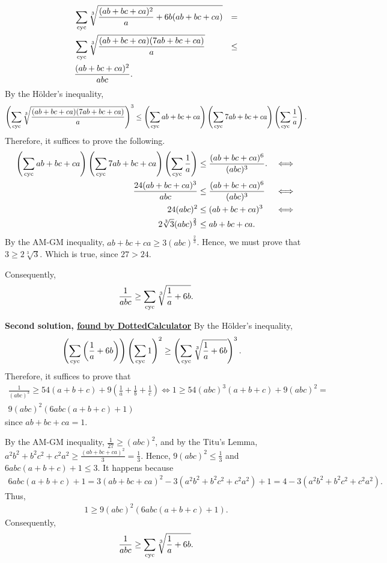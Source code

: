 \begin{align*}
	 & \sum_{\text{cyc}} \sqrt[3]{\frac{(ab+bc+ca)^2}{a}+6b(ab+bc+ca)} & =   \\
	 & \sum_{\text{cyc}} \sqrt[3]{\frac{(ab+bc+ca)(7ab+bc+ca)}{a}}     & \le \\
	 & \frac{(ab+bc+ca)^2}{abc}.
\end{align*}
By the Hölder's inequality,
\begin{align*}
	\left(\sum_{\text{cyc}} \sqrt[3]{\frac{(ab+bc+ca)(7ab+bc+ca)}{a}}\right)^3 \le \left(\sum_{\text{cyc}} ab+bc+ca\right)\left(\sum_{\text{cyc}} 7ab+bc+ca\right)\left(\sum_{\text{cyc}} \frac{1}{a}\right).
\end{align*}
Therefore, it suffices to prove the following.
\begin{align*}
	\left(\sum_{\text{cyc}} ab+bc+ca\right)\left(\sum_{\text{cyc}} 7ab+bc+ca\right)\left(\sum_{\text{cyc}} \frac{1}{a}\right) & \le \frac{(ab+bc+ca)^6}{(abc)^3}. & \iff \\
	\frac{24(ab+bc+ca)^3}{abc}                                                         & \le \frac{(ab+bc+ca)^6}{(abc)^3}  & \iff \\
	24(abc)^2                                                                          & \le (ab+bc+ca)^3                  & \iff \\
	2\sqrt[3]{3}(abc)^{\frac{2}{3}}                                                    & \le ab+bc+ca.
\end{align*}
By the AM-GM inequality, $ab+bc+ca \ge 3(abc)^{\frac{2}{3}}$. Hence, we must prove that $3 \ge 2\sqrt[3]{3}$.
Which is true, since $27>24$.

Consequently,
\[
	\frac{1}{abc} \ge \sum_{\text{cyc}} \sqrt[3]{\frac{1}{a} +6b}.
\]

\textbf{\textcolor{color2}{Second solution, \href{https://artofproblemsolving.com/community/c6h30865p23434282}{found by DottedCalculator}}} By the Hölder's inequality,
\begin{align*}
	\left(\sum_{\text{cyc}} \left(\frac{1}{a}+6b\right)\right)\left(\sum_{\text{cyc}} 1\right)^2 & \ge \left(\sum_{\text{cyc}} \sqrt[3]{\frac{1}{a}+6b}\right)^3.
\end{align*}
Therefore, it suffices to prove that
\begin{align*}
	\frac{1}{(abc)^3} \ge 54(a+b+c)+9\left(\frac{1}{a}+\frac{1}{b}+\frac{1}{c}\right) \iff
	1 \ge 54(abc)^3(a+b+c) + 9(abc)^2 = \\
	9(abc)^2(6abc(a+b+c)+1)
\end{align*}
since $ab+bc+ca=1$.

By the AM-GM inequality, $\frac{1}{27} \ge (abc)^2$, and by the Titu's Lemma, $a^2b^2+b^2c^2+c^2a^2 \ge \frac{(ab+bc+ca)^2}{3} = \frac{1}{3}$.
Hence, $9(abc)^2 \le \frac{1}{3}$ and $6abc(a+b+c)+1 \le 3$. It happens because
\begin{align*}
	6abc(a+b+c)+1 = 3(ab+bc+ca)^2 -3(a^2b^2+b^2c^2+c^2a^2)+1=4-3(a^2b^2+b^2c^2+c^2a^2).
\end{align*}
Thus,
\begin{align*}
	1 \ge 9(abc)^2(6abc(a+b+c)+1).
\end{align*}
Consequently,
\begin{align*}
	\frac{1}{abc} \ge \sum_{\text{cyc}} \sqrt[3]{\frac{1}{a} +6b}.
\end{align*}

